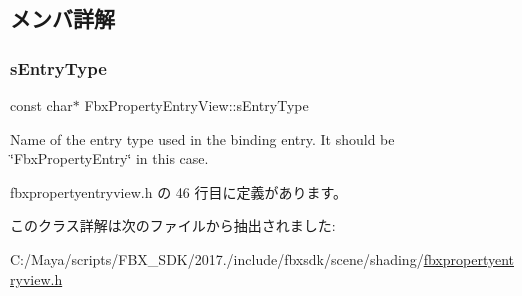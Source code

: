 \subsection{メンバ詳解}
\mbox{\label{class_fbx_property_entry_view_a862b7d0e633c2cb246b5b63a48ffd706}} 
\subsubsection{\texorpdfstring{s\+Entry\+Type}{sEntryType}}
{\footnotesize\ttfamily const char$\ast$ Fbx\+Property\+Entry\+View\+::s\+Entry\+Type\hspace{0.3cm}{\ttfamily [static]}}

Name of the entry type used in the binding entry. It should be \char`\"{}\+Fbx\+Property\+Entry\char`\"{} in this case. 

 fbxpropertyentryview.\+h の 46 行目に定義があります。



このクラス詳解は次のファイルから抽出されました\+:\begin{DoxyCompactItemize}
\item 
C\+:/\+Maya/scripts/\+F\+B\+X\+\_\+\+S\+D\+K/2017./include/fbxsdk/scene/shading/\hyperlink{fbxpropertyentryview_8h}{fbxpropertyentryview.\+h}\end{DoxyCompactItemize}
